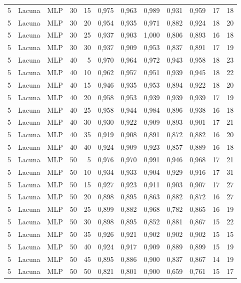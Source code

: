 \begin{longtable}{@{}rllrrrrrrrrr@{}}
5 & Lacuna & MLP & 30 & 15 & 0,975 & 0,963 & 0,989 & 0,931 & 0,959 & 17 & 18 \\
5 & Lacuna & MLP & 30 & 20 & 0,954 & 0,935 & 0,971 & 0,882 & 0,924 & 18 & 20 \\
5 & Lacuna & MLP & 30 & 25 & 0,937 & 0,903 & 1,000 & 0,806 & 0,893 & 16 & 18 \\
5 & Lacuna & MLP & 30 & 30 & 0,937 & 0,909 & 0,953 & 0,837 & 0,891 & 17 & 19 \\
5 & Lacuna & MLP & 40 & 5 & 0,970 & 0,964 & 0,972 & 0,943 & 0,958 & 18 & 23 \\
5 & Lacuna & MLP & 40 & 10 & 0,962 & 0,957 & 0,951 & 0,939 & 0,945 & 18 & 22 \\
5 & Lacuna & MLP & 40 & 15 & 0,946 & 0,935 & 0,953 & 0,894 & 0,922 & 18 & 20 \\
5 & Lacuna & MLP & 40 & 20 & 0,958 & 0,953 & 0,939 & 0,939 & 0,939 & 17 & 19 \\
5 & Lacuna & MLP & 40 & 25 & 0,958 & 0,944 & 0,984 & 0,896 & 0,938 & 16 & 18 \\
5 & Lacuna & MLP & 40 & 30 & 0,930 & 0,922 & 0,909 & 0,893 & 0,901 & 17 & 21 \\
5 & Lacuna & MLP & 40 & 35 & 0,919 & 0,908 & 0,891 & 0,872 & 0,882 & 16 & 20 \\
5 & Lacuna & MLP & 40 & 40 & 0,924 & 0,909 & 0,923 & 0,857 & 0,889 & 16 & 18 \\
5 & Lacuna & MLP & 50 & 5 & 0,976 & 0,970 & 0,991 & 0,946 & 0,968 & 17 & 21 \\
5 & Lacuna & MLP & 50 & 10 & 0,934 & 0,933 & 0,904 & 0,929 & 0,916 & 17 & 31 \\
5 & Lacuna & MLP & 50 & 15 & 0,927 & 0,923 & 0,911 & 0,903 & 0,907 & 17 & 27 \\
5 & Lacuna & MLP & 50 & 20 & 0,898 & 0,895 & 0,863 & 0,882 & 0,872 & 16 & 27 \\
5 & Lacuna & MLP & 50 & 25 & 0,899 & 0,882 & 0,968 & 0,782 & 0,865 & 16 & 19 \\
5 & Lacuna & MLP & 50 & 30 & 0,898 & 0,895 & 0,852 & 0,881 & 0,867 & 15 & 22 \\
5 & Lacuna & MLP & 50 & 35 & 0,926 & 0,921 & 0,902 & 0,902 & 0,902 & 15 & 15 \\
5 & Lacuna & MLP & 50 & 40 & 0,924 & 0,917 & 0,909 & 0,889 & 0,899 & 15 & 19 \\
5 & Lacuna & MLP & 50 & 45 & 0,895 & 0,886 & 0,900 & 0,837 & 0,867 & 14 & 19 \\
5 & Lacuna & MLP & 50 & 50 & 0,821 & 0,801 & 0,900 & 0,659 & 0,761 & 15 & 17 \\

\end{longtable}
